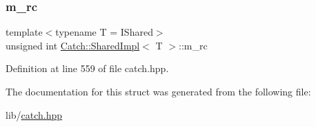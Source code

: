 \subsubsection{\texorpdfstring{m\+\_\+rc}{m\_rc}}
{\footnotesize\ttfamily template$<$typename T = I\+Shared$>$ \\
unsigned int \hyperlink{struct_catch_1_1_shared_impl}{Catch\+::\+Shared\+Impl}$<$ T $>$\+::m\+\_\+rc\hspace{0.3cm}{\ttfamily [mutable]}}



Definition at line 559 of file catch.\+hpp.



The documentation for this struct was generated from the following file\+:\begin{DoxyCompactItemize}
\item 
lib/\hyperlink{catch_8hpp}{catch.\+hpp}\end{DoxyCompactItemize}
